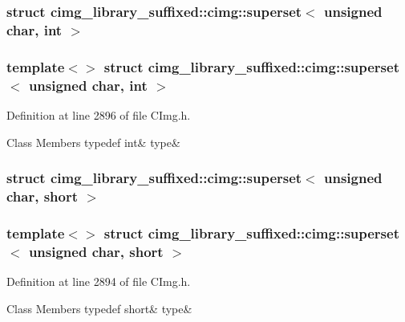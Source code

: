 \subsubsection{struct cimg\+\_\+library\+\_\+suffixed\+:\+:cimg\+:\+:superset$<$ unsigned char, int $>$}
\subsubsection*{template$<$$>$\newline
struct cimg\+\_\+library\+\_\+suffixed\+::cimg\+::superset$<$ unsigned char, int $>$}



Definition at line 2896 of file C\+Img.\+h.

\begin{DoxyFields}{Class Members}
\mbox{\label{namespacecimg__library__suffixed_1_1cimg_a37daeabce31aa7be86df684059fec2c2}} 
typedef int&
type&
\\
\hline

\end{DoxyFields}
\label{structcimg__library__suffixed_1_1cimg_1_1superset_3_01unsigned_01char_00_01short_01_4}
\subsubsection{struct cimg\+\_\+library\+\_\+suffixed\+:\+:cimg\+:\+:superset$<$ unsigned char, short $>$}
\subsubsection*{template$<$$>$\newline
struct cimg\+\_\+library\+\_\+suffixed\+::cimg\+::superset$<$ unsigned char, short $>$}



Definition at line 2894 of file C\+Img.\+h.

\begin{DoxyFields}{Class Members}
\mbox{\label{namespacecimg__library__suffixed_1_1cimg_acf0139f61db3180ac2e67ff00b378525}} 
typedef short&
type&
\\
\hline

\end{DoxyFields}
\label{structcimg__library__suffixed_1_1cimg_1_1superset_3_01unsigned_01char_00_01signed_01char_01_4}

